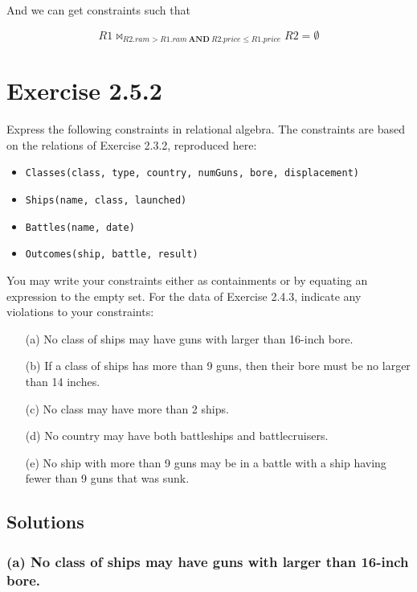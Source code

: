 \documentclass{cshwk}
\begin{document}
And we can get constraints such that

$$
    R1 \bowtie_{R2.ram > R1.ram \ \mathbf{AND} \
        R2.price \leq R1.price} R2 = \emptyset
$$

\section{Exercise 2.5.2}

Express the following constraints in relational algebra. The constraints are based on the relations of Exercise 2.3.2, reproduced here:

\begin{itemize}
    \item \texttt{Classes(class, type, country, numGuns, bore, displacement)}
    \item \texttt{Ships(name, class, launched)}
    \item \texttt{Battles(name, date)}
    \item \texttt{Outcomes(ship, battle, result)}
\end{itemize}

You may write your constraints either as containments or by equating an expression to the empty set. For the data of Exercise 2.4.3, indicate any violations to your constraints:

\begin{itemize}
    \item[(a)] No class of ships may have guns with larger than 16-inch bore.

    \item[(b)] If a class of ships has more than 9 guns, then their bore must be no larger than 14 inches.

    \item[(c)] No class may have more than 2 ships.

    \item[(d)] No country may have both battleships and battlecruisers.

    \item[(e)] No ship with more than 9 guns may be in a battle with a ship having fewer than 9 guns that was sunk.
\end{itemize}


\subsection*{Solutions}

\subsubsection*{(a) No class of ships may have guns with larger than 16-inch bore.}
\end{document}
